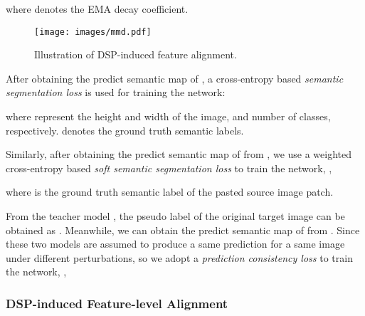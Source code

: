 \documentclass[sigconf]{acmart}
\begin{document}
where  denotes the EMA decay coefficient.


\begin{figure}[t]
    \centering
    \texttt{[image: images/mmd.pdf]}
    \caption{Illustration of DSP-induced feature alignment.}
    \label{mmd}
\end{figure}



After obtaining the predict semantic map  of , a cross-entropy based \textit{semantic segmentation loss} is used for training the network:

where  represent the height and width of the image, and number of classes, respectively.  denotes the ground truth semantic labels. 

Similarly, after obtaining the predict semantic map  of  from , we use a weighted cross-entropy based \textit{soft semantic segmentation loss} to train the network, , 

where  is the ground truth semantic label of the pasted source image patch. 

From the teacher model , the pseudo label of the original target image  can be obtained as . Meanwhile, we can obtain the predict semantic map  of  from . Since these two models are assumed to produce a same prediction for a same image under different perturbations, so we adopt a \textit{prediction consistency loss} to train the network, ,



\subsubsection{DSP-induced Feature-level Alignment}
\end{document}
